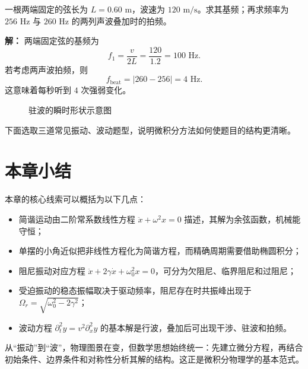 \begin{example}
一根两端固定的弦长为 $L=0.60\text{ m}$，波速为 $120\text{ m/s}$。求其基频；再求频率为 $256\text{ Hz}$ 与 $260\text{ Hz}$ 的两列声波叠加时的拍频。

\textbf{解：} 两端固定弦的基频为
\[
f_1=\frac{v}{2L}=\frac{120}{1.2}=100\text{ Hz}.
\]
若考虑两声波拍频，则
\[
f_{\text{beat}}=|260-256|=4\text{ Hz}.
\]
这意味着每秒听到 $4$ 次强弱变化。
\end{example}

\begin{figure}[H]
\centering
{}
\caption{驻波的瞬时形状示意图}
\end{figure}

下面选取三道常见振动、波动题型，说明微积分方法如何使题目的结构更清晰。

\section*{本章小结}

本章的核心线索可以概括为以下几点：
\begin{itemize}
  \item 简谐运动由二阶常系数线性方程 $\ddot x+\omega^2x=0$ 描述，其解为余弦函数，机械能守恒；
  \item 单摆的小角近似把非线性方程化为简谐方程，而精确周期需要借助椭圆积分；
  \item 阻尼振动对应方程 $\ddot x+2\gamma\dot x+\omega_0^2x=0$，可分为欠阻尼、临界阻尼和过阻尼；
  \item 受迫振动的稳态振幅取决于驱动频率，阻尼存在时共振峰出现于 $\Omega_r=\sqrt{\omega_0^2-2\gamma^2}$；
  \item 波动方程 $\partial_t^2 y=v^2\partial_x^2 y$ 的基本解是行波，叠加后可出现干涉、驻波和拍频。
\end{itemize}

从“振动”到“波”，物理图景在变，但数学思想始终统一：先建立微分方程，再结合初始条件、边界条件和对称性分析其解的结构。这正是微积分物理学的基本范式。
